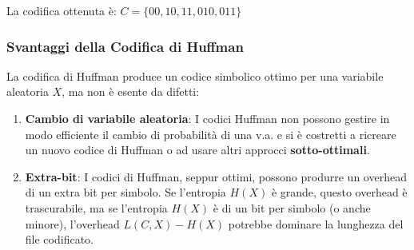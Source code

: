 La codifica ottenuta è: $C=\{00, 10, 11, 010, 011\}$

\subsubsection{Svantaggi della Codifica di Huffman}
La codifica di Huffman produce un codice simbolico ottimo per una variabile aleatoria $X$, ma non è esente da difetti:
\begin{enumerate}
	\item \textbf{Cambio di variabile aleatoria}: I codici Huffman non possono gestire in modo efficiente il cambio di probabilità di una v.a. e si è costretti a ricreare un nuovo codice di Huffman o ad usare altri approcci \textbf{sotto-ottimali}.
	\item \textbf{Extra-bit}: I codici di Huffman, seppur ottimi, possono produrre un overhead di un extra bit per simbolo. Se l'entropia $H(X)$ è grande, questo overhead è trascurabile, ma se l'entropia $H(X)$ è di un bit per simbolo (o anche minore), l'overhead $L(C,X) - H(X)$ potrebbe dominare la lunghezza del file	codificato. 
\end{enumerate}


\newpage
